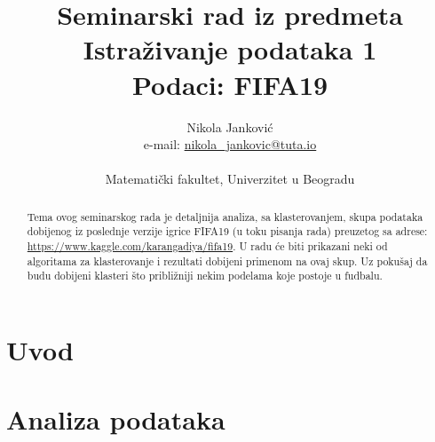 \documentclass[a4paper, 11pt]{article}
\title{\large Seminarski rad iz predmeta Istra\v zivanje podataka 1
		\\ Podaci: FIFA19 }
\author{Nikola Jankovi\'c 
		\\ e-mail: \href{mailto:nikola_jankovic@tuta.io}{nikola\_jankovic@tuta.io}
		\\ \\ \small{Matemati\v cki fakultet, Univerzitet u Beogradu}
}
\begin{document}
\begin{titlepage}
\maketitle
\thispagestyle{empty}

\begin{abstract}
Tema ovog seminarskog rada je detaljnija analiza, sa klasterovanjem,
skupa podataka dobijenog iz poslednje verzije
igrice FIFA19 (u toku pisanja rada) preuzetog sa adrese: \url{https://www.kaggle.com/karangadiya/fifa19}.
U radu će biti prikazani neki od algoritama za klasterovanje i rezultati dobijeni primenom na ovaj skup.
Uz pokušaj da budu dobijeni klasteri što približniji nekim podelama koje postoje u fudbalu. 
\end{abstract}

\end{titlepage}

\section{Uvod}


\section{Analiza podataka}
\end{document}
